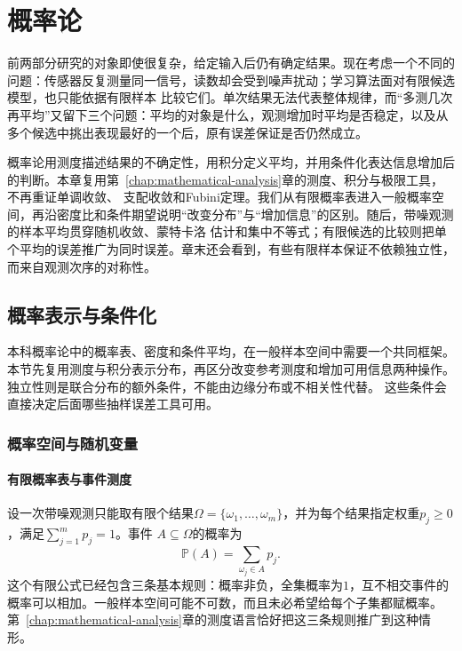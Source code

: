 \chapter{概率论}
\label{chap:probability-theory}

前两部分研究的对象即使很复杂，给定输入后仍有确定结果。现在考虑一个不同的问题：传感器反复测量同一信号，读数却会受到噪声扰动；学习算法面对有限候选模型，也只能依据有限样本
比较它们。单次结果无法代表整体规律，而“多测几次再平均”又留下三个问题：平均的对象是什么，观测增加时平均是否稳定，以及从多个候选中挑出表现最好的一个后，原有误差保证是否仍然成立。

概率论用测度描述结果的不确定性，用积分定义平均，并用条件化表达信息增加后的判断。本章复用第~\ref{chap:mathematical-analysis}章的测度、积分与极限工具，不再重证单调收敛、
支配收敛和Fubini定理。我们从有限概率表进入一般概率空间，再沿密度比和条件期望说明“改变分布”与“增加信息”的区别。随后，带噪观测的样本平均贯穿随机收敛、蒙特卡洛
估计和集中不等式；有限候选的比较则把单个平均的误差推广为同时误差。章末还会看到，有些有限样本保证不依赖独立性，而来自观测次序的对称性。

\section{概率表示与条件化}
\label{sec:probability-representation-conditioning}

本科概率论中的概率表、密度和条件平均，在一般样本空间中需要一个共同框架。
本节先复用测度与积分表示分布，再区分改变参考测度和增加可用信息两种操作。
独立性则是联合分布的额外条件，不能由边缘分布或不相关性代替。
这些条件会直接决定后面哪些抽样误差工具可用。

\subsection{概率空间与随机变量}
\label{sec:probability-spaces-random-variables}

\subsubsection{有限概率表与事件测度}

设一次带噪观测只能取有限个结果\(\Omega=\{\omega_1,\ldots,\omega_m\}\)，并为每个结果指定权重\(p_j\geq0\)，满足\(\sum_{j=1}^{m}p_j=1\)。事件
\(A\subseteq\Omega\)的概率为
\[ \mathbb{P}(A)=\sum_{\omega_j\in A}p_j. \]
这个有限公式已经包含三条基本规则：概率非负，全集概率为\(1\)，互不相交事件的概率可以相加。一般样本空间可能不可数，而且未必希望给每个子集都赋概率。第~\ref{chap:mathematical-analysis}章的测度语言恰好把这三条规则推广到这种情形。

